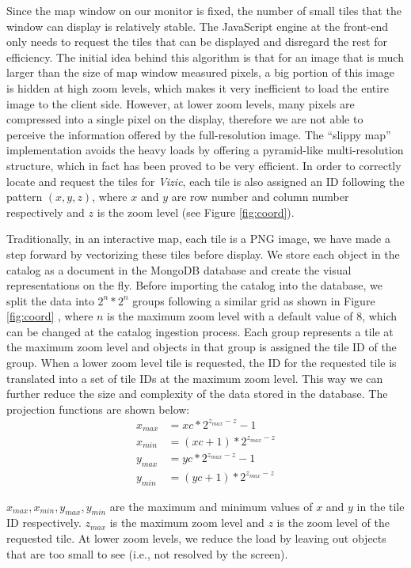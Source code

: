 \documentclass[../vis.tex]{subfiles}
\begin{document}
Since the map window on our monitor is fixed, the number of small tiles that the window can display is relatively stable.
The JavaScript engine at the front-end only needs to request the tiles that can be displayed and disregard the rest for efficiency.
The initial idea behind this algorithm is that for an image that is much larger than the size of map window measured pixels, a big portion of this image is hidden at high zoom levels, which makes it very inefficient to load the entire image to the client side.
However, at lower zoom levels, many pixels are compressed into a single pixel on the display, therefore we are not able to perceive the information offered by the full-resolution image.
The ``slippy map'' implementation avoids the heavy loads by offering a pyramid-like multi-resolution structure, which in fact has been proved to be very efficient.
In order to correctly locate and request the tiles for \textit{Vizic}, each tile is also assigned an ID following the pattern $ (x, y, z) $, where $x$ and $y$ are row number and column number respectively and $z$ is the zoom level (see Figure \ref{fig:coord}).


Traditionally, in an interactive map, each tile is a PNG image, we have made a step forward by vectorizing these tiles before display.
We store each object in the catalog as a document in the MongoDB database and create the visual representations on the fly.
Before importing the catalog into the database, we split the data into $2^{n}*2^{n}$ groups following a similar grid as shown in Figure \ref{fig:coord} , where $n$ is the maximum zoom level with a default value of $8$, which can be changed at the catalog ingestion process.
Each group represents a tile at the maximum zoom level and objects in that group is assigned the tile ID of the group.
When a lower zoom level tile is requested, the ID for the requested tile is translated into a set of tile IDs at the maximum zoom level. This way we can further reduce the size and complexity of the data stored in the database.
The projection functions are shown below:
\begin{align*}
x_{max} &= xc*2^{z_{max}-z}-1\\
x_{min} &= (xc+1)*2^{z_{max}-z}\\
y_{max} &= yc*2^{z_{max}-z}-1\\
y_{min} &= (yc+1)*2^{z_{max}-z}
\end{align*}

$ x_{max}, x_{min}, y_{max}, y_{min} $ are the maximum and minimum values of $x$ and $y$ in the tile ID respectively.
$z_{max}$ is the maximum zoom level and $z$ is the zoom level of the requested tile.
At lower zoom levels, we reduce the load by leaving out objects that are too small to see (i.e., not resolved by the screen).
\end{document}
